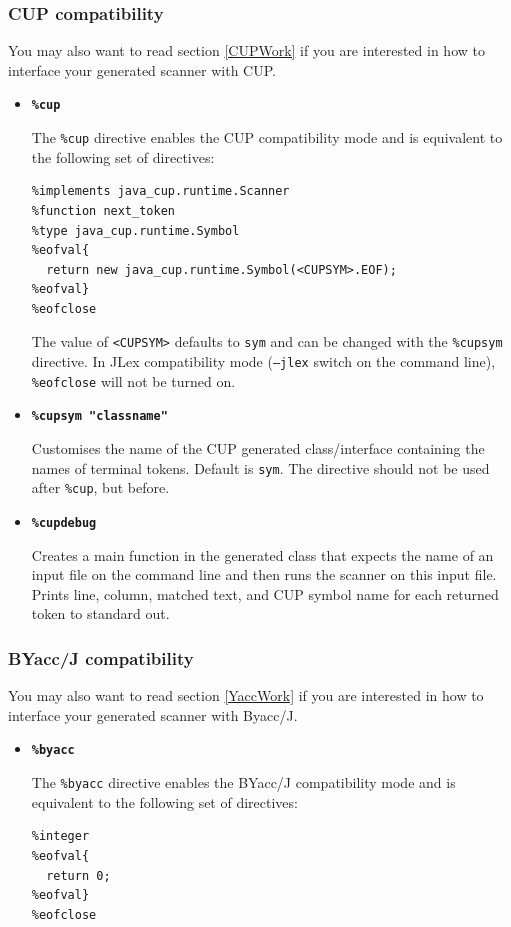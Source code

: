 \documentclass[11pt]{scrartcl}
\begin{document}
\subsubsection{CUP compatibility\label{CupMode}}
You may also want to read section \ref{CUPWork} 
if you are interested in how to interface your generated
scanner with CUP.
\begin{itemize}
\item
{\bf \texttt{\%cup}}

The \texttt{\%cup} directive enables the CUP compatibility mode and is equivalent
to the following set of directives:

\begin{verbatim}
%implements java_cup.runtime.Scanner
%function next_token
%type java_cup.runtime.Symbol
%eofval{
  return new java_cup.runtime.Symbol(<CUPSYM>.EOF);
%eofval}
%eofclose
\end{verbatim}

The value of \texttt{<CUPSYM>} defaults to \texttt{sym} and can be
changed with the \texttt{\%cupsym} directive. In JLex compatibility
mode (\texttt{--jlex} switch on the command line), \texttt{\%eofclose}
will not be turned on.

\item
{\bf \texttt{\%cupsym "classname"}}

Customises the name of the CUP generated class/interface 
containing the names of terminal tokens. Default is \texttt{sym}.
The directive should not be used after \texttt{\%cup}, but before.

\item
{\bf \texttt{\%cupdebug}}

Creates a main function in the generated class that expects the name
of an input file on the command line and then runs the scanner on this
input file. Prints line, column, matched text, and CUP symbol name for
each returned token to standard out.

\end{itemize}

\subsubsection{BYacc/J compatibility\label{YaccMode}}
You may also want to read section \ref{YaccWork} 
if you are interested in how to interface your generated
scanner with Byacc/J.
\begin{itemize}
\item
{\bf \texttt{\%byacc}}

The \texttt{\%byacc} directive enables the BYacc/J compatibility mode and is equivalent
to the following set of directives:

\begin{verbatim}
%integer
%eofval{
  return 0;
%eofval}
%eofclose
\end{verbatim}

\end{itemize}
\end{document}
